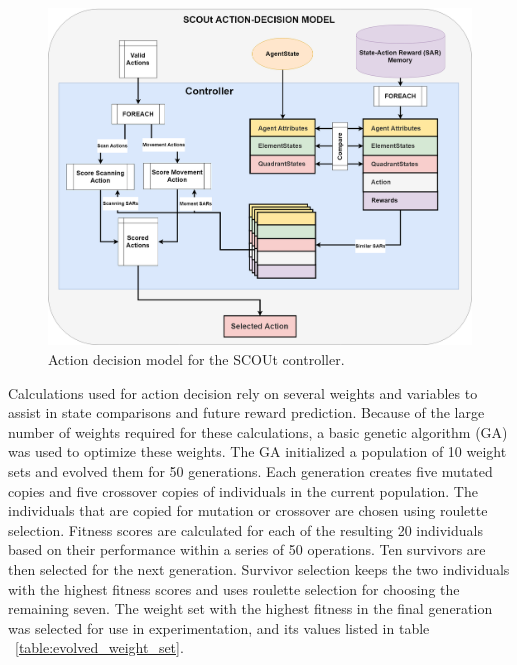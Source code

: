 \begin{figure}[H]
  \includegraphics[width=1.0\columnwidth]{Figures/scout_decision_model.png}
  \caption{Action decision model for the SCOUt controller.}
  \label{fig:scout_decision_model}
\end{figure}

Calculations used for action decision rely on several weights and variables to assist in state comparisons and future reward prediction.
Because of the large number of weights required for these calculations, a basic genetic algorithm (GA) was used to optimize these weights.
The GA initialized a population of 10 weight sets and evolved them for 50 generations.
Each generation creates five mutated copies and five crossover copies of individuals in the current population.
The individuals that are copied for mutation or crossover are chosen using roulette selection.
Fitness scores are calculated for each of the resulting 20 individuals based on their performance within a series of 50 operations.
Ten survivors are then selected for the next generation.
Survivor selection keeps the two individuals with the highest fitness scores and uses roulette selection for choosing the remaining seven.
The weight set with the highest fitness in the final generation was selected for use in experimentation, and its values listed in table ~\ref{table:evolved_weight_set}.


